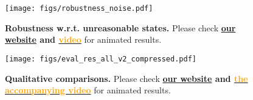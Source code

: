 \begin{figure}[ht]
  \centering
  \vspace{-10pt}
  \texttt{[image: figs/robustness\_noise.pdf]}
  \vspace{-20pt}
  \caption{\footnotesize
  \textbf{Robustness w.r.t. unreasonable states. }
  Please check \textbf{\href{https://projectwebsite7.github.io/gene-dex-manip/}{our website} and {\href{https://projectwebsite7.github.io/gene-dex-manip/static/videos-lowres/video_7.mp4}{\textcolor{orange}{video}}}} for animated results.
  }
  \label{fig_res_robustness}
  \vspace{-10pt}
\end{figure}


\begin{figure}[ht]
  \centering
  \texttt{[image: figs/eval\_res\_all\_v2\_compressed.pdf]}
  \caption{\footnotesize
  \textbf{Qualitative comparisons. }
  Please check \textbf{\href{https://projectwebsite7.github.io/gene-dex-manip/}{our website} and {\href{https://projectwebsite7.github.io/gene-dex-manip/static/videos-lowres/video_7.mp4}{\textcolor{orange}{the accompanying video}}}} for animated results.
  }
  \label{fig_res}
  \vspace{-10pt}
\end{figure}





